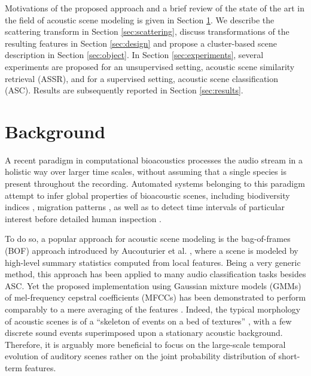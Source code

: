 \documentclass[journal]{IEEEtran}
\makeatletter
\newcommand*{\ie}{i.e.\@\xspace}
\makeatother
\begin{document}
Motivations of the proposed approach and a brief review of the state of the art in the field of acoustic scene modeling is given in Section \ref{sec:soa}. We describe the scattering transform in Section \ref{sec:scattering}, discuss transformations of the resulting features in Section \ref{sec:design} and propose a cluster-based scene description in Section \ref{sec:object}. In Section \ref{sec:experiments}, several experiments are proposed for an unsupervised setting, acoustic scene similarity retrieval (ASSR), and for a supervised setting, acoustic scene classification (ASC). Results are subsequently reported in Section \ref{sec:results}.

\section{Background} \label{sec:soa}


A recent paradigm in computational bioacoustics processes the audio stream in a holistic way over larger time scales, without assuming that a single species is present throughout the recording. Automated systems belonging to this paradigm attempt to infer global properties of bioacoustic scenes, including biodiversity indices \cite{Bardeli2010}, migration patterns \cite{Obrist2010}, as well as to detect time intervals of particular interest before detailed human inspection \cite{rosenstock2002landbird,diefenbach2007incorporating}.

To do so, a popular approach for acoustic scene modeling is the bag-of-frames (BOF) approach introduced by Aucouturier et al. \cite{aucouturier2007bag}, where a scene is modeled by high-level summary statistics computed from local features.
Being a very generic method, this approach has been applied to many audio classification tasks besides ASC.
Yet the proposed implementation using Gaussian mixture models (GMMs) of mel-frequency cepstral coefficients (MFCCs) has been demonstrated to perform comparably to a mere averaging of the features \cite{lagrange:hal-01082501}.
Indeed, the typical morphology of acoustic scenes is of a ``skeleton of events on a bed of textures'' \cite{nelken2013}, with a few discrete sound events superimposed upon a stationary acoustic background.
Therefore, it is arguably more beneficial to focus on the large-scale temporal evolution of auditory scenes rather on the joint probability distribution of short-term features.
\end{document}
